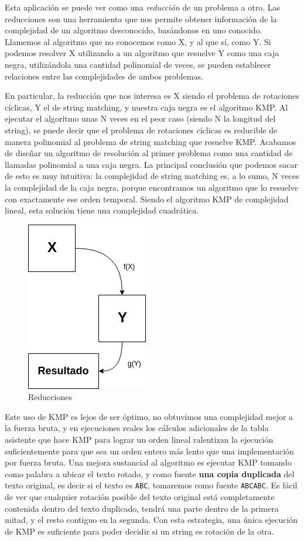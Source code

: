 \documentclass{article}
\begin{document}
Esta aplicación se puede ver como una \textit{reducción} de un problema a otro. Las reducciones son una herramienta que nos permite obtener información de la complejidad de un algoritmo desconocido, basándonos en uno conocido. Llamemos al algoritmo que no conocemos como X, y al que sí, como Y. Si podemos resolver X utilizando a un algoritmo que resuelve Y como una caja negra, utilizándola una cantidad polinomial de veces, se pueden establecer relaciones entre las complejidades de ambos problemas.

En particular, la reducción que nos interesa es X siendo el problema de rotaciones cíclicas, Y el de string matching, y nuestra caja negra es el algoritmo KMP. Al ejecutar el algoritmo unas N veces en el peor caso (siendo N la longitud del string), se puede decir que el problema de rotaciones cíclicas es reducible de manera polinomial al problema de string matching que resuelve KMP. Acabamos de diseñar un algoritmo de resolución al primer problema como una cantidad de llamadas polinomial a una caja negra. La principal conclusión que podemos sacar de esto es muy intuitiva: la complejidad de string matching es, a lo sumo, N veces la complejidad de la caja negra, porque encontramos un algoritmo que lo resuelve con exactamente ese orden temporal. Siendo el algoritmo KMP de complejidad lineal, esta solución tiene una complejidad cuadrática. 

\begin{figure}[!htp]
    \centering
    \includegraphics[scale=0.5]{res/reduccion.png} 
    \caption{Reducciones}
\end{figure}

Este uso de KMP es lejos de ser óptimo, no obtuvimos una complejidad mejor a la fuerza bruta, y en ejecuciones reales los cálculos adicionales de la tabla asistente que hace KMP para lograr un orden lineal ralentizan la ejecución suficientemente para que sea un orden entero más lento que una implementación por fuerza bruta. Una mejora sustancial al algoritmo es ejecutar KMP tomando como palabra a ubicar el texto rotado, y como fuente \textbf{una copia duplicada} del texto original, es decir si el texto es \texttt{ABC}, tomaremos como fuente \texttt{ABCABC}. Es fácil de ver que cualquier rotación posible del texto original está completamente contenida dentro del texto duplicado, tendrá una parte dentro de la primera mitad, y el resto contiguo en la segunda. Con esta estrategia, una única ejecución de KMP es suficiente para poder decidir si un string es rotación de la otra. 
\end{document}
